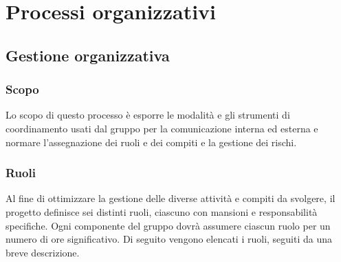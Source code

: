 \documentclass[10pt, a4paper]{article}
\begin{document}
\section{Processi organizzativi}

\subsection{Gestione organizzativa}
\subsubsection{Scopo}
Lo scopo di questo processo è esporre le modalità e gli strumenti di coordinamento usati dal gruppo per la comunicazione interna ed esterna e normare l'assegnazione dei ruoli e dei compiti e la gestione dei rischi.

\subsubsection{Ruoli}
Al fine di ottimizzare la gestione delle diverse attività e compiti da svolgere, il progetto definisce sei distinti ruoli, ciascuno con mansioni e responsabilità specifiche.
Ogni componente del gruppo dovrà assumere ciascun ruolo per un numero di ore significativo.
Di seguito vengono elencati i ruoli, seguiti da una breve descrizione.
\end{document}
